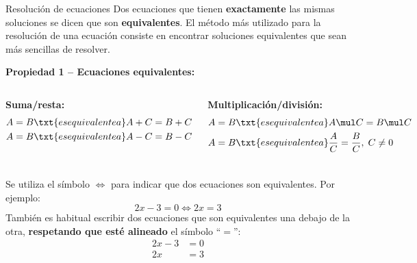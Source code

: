 \documentclass[9pt, aspectratio=169]{beamer}
\begin{document}
\begin{frame}{Resolución de ecuaciones}
    Dos ecuaciones que tienen \textbf{exactamente} las mismas soluciones se dicen que son \textbf{equivalentes}. El método más utilizado para la resolución de una ecuación consiste en encontrar soluciones equivalentes que sean más sencillas de resolver.

\textbf{Propiedad 1 -- Ecuaciones equivalentes:} \medskip

\begin{columns}[t]
\cx
\textbf{Suma/resta:} 
\begin{align*}
    A &= B \txt{es equivalente a} A + C = B + C \\
    A &= B \txt{es equivalente a} A - C = B - C \\
\end{align*}

\cx
\textbf{Multiplicación/división:}
\begin{align*}
    A &= B \txt{es equivalente a} A \mul C = B \mul C \\
    A &= B \txt{es equivalente a} \frac{A}{C} = \frac{B}{C}, \; C \neq 0
\end{align*}
\end{columns}

\vspace{-1em}
\begin{alertblock}{\centering \faInfoCircle}
    \begin{multicols}{2}
    Se utiliza el símbolo $\Longleftrightarrow$ para indicar que dos ecuaciones son equivalentes. Por ejemplo: 
    \[ 2 x - 3 = 0 \Longleftrightarrow 2 x = 3 \]
    También es habitual escribir dos ecuaciones que son equivalentes una debajo de la otra, \textbf{respetando que esté alineado} el símbolo ``$=$'':
    \begin{align*}
        2 x - 3 &= 0 \\
        2 x &= 3
    \end{align*}
\end{multicols}
\end{alertblock}
\end{frame}
\end{document}
